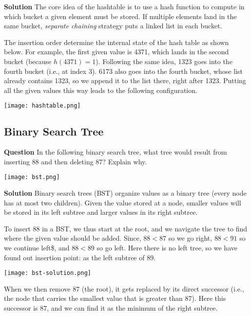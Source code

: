 \documentclass[11pt]{article}
\begin{document}
\textbf{Solution} The core idea of the hashtable is to use a hash function to
 compute in which bucket a given element must be stored. If multiple
 elements land in the same bucket, \emph{separate chaining} strategy puts a
 linked list in each bucket.

The insertion order determine the internal state of the hash table as
shown below. For example, the first given value is 4371, which lands
in the second bucket (because \(h(4371) = 1\)). Following the same
idea, 1323 goes into the fourth bucket (i.e., at index 3). 6173 also
goes into the fourth bucket, whose list already contains 1323, so we
append it to the list there, right after 1323. Putting all the given
values this way leads to the following configuration.

\begin{center}
\texttt{[image: hashtable.png]}
\end{center}


\subsection{Binary Search Tree}
\label{sec:orgb02ad1b}

\textbf{Question} In the following binary search tree, what tree would result
from inserting 88 and then deleting 87? Explain why.

\begin{center}
\texttt{[image: bst.png]}
\end{center}


\textbf{Solution} Binary search trees (BST) organize values
as a binary tree (every node has at most two children). Given the
value stored at a node, smaller values will be stored in its left
subtree and larger values in its right subtree.

To insert 88 in a BST, we thus start at the root, and we navigate the
tree to find where the given value should be added. Since, \(88<87\) so
we go right, \(88<91\) so we continue left\$, and \(88<89\) so go
left. Here there is no left tree, so we have found out insertion
point: as the left subtree of 89.

\begin{center}
\texttt{[image: bst-solution.png]}
\end{center}

When we then remove 87 (the root), it gets replaced by its direct
successor (i.e., the node that carries the smallest value that is
greater than 87). Here this successor is 87, and we can find it as the
minimum of the right subtree.
\end{document}
